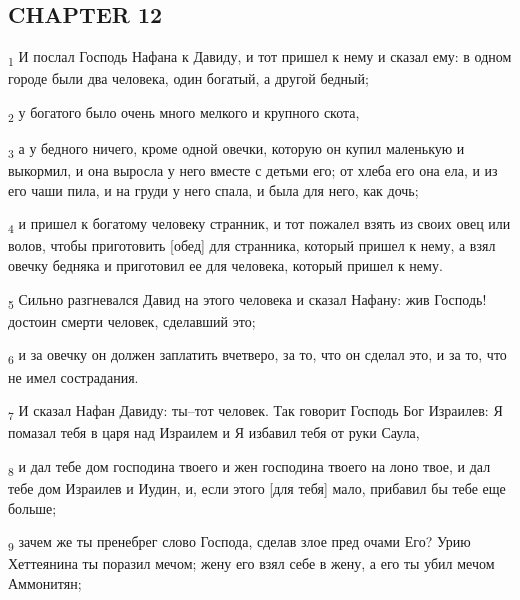 \subsection{CHAPTER 12}
\begin{tcolorbox}
\textsubscript{1} И послал Господь Нафана к Давиду, и тот пришел к нему и сказал ему: в одном городе были два человека, один богатый, а другой бедный;
\end{tcolorbox}
\begin{tcolorbox}
\textsubscript{2} у богатого было очень много мелкого и крупного скота,
\end{tcolorbox}
\begin{tcolorbox}
\textsubscript{3} а у бедного ничего, кроме одной овечки, которую он купил маленькую и выкормил, и она выросла у него вместе с детьми его; от хлеба его она ела, и из его чаши пила, и на груди у него спала, и была для него, как дочь;
\end{tcolorbox}
\begin{tcolorbox}
\textsubscript{4} и пришел к богатому человеку странник, и тот пожалел взять из своих овец или волов, чтобы приготовить [обед] для странника, который пришел к нему, а взял овечку бедняка и приготовил ее для человека, который пришел к нему.
\end{tcolorbox}
\begin{tcolorbox}
\textsubscript{5} Сильно разгневался Давид на этого человека и сказал Нафану: жив Господь! достоин смерти человек, сделавший это;
\end{tcolorbox}
\begin{tcolorbox}
\textsubscript{6} и за овечку он должен заплатить вчетверо, за то, что он сделал это, и за то, что не имел сострадания.
\end{tcolorbox}
\begin{tcolorbox}
\textsubscript{7} И сказал Нафан Давиду: ты--тот человек. Так говорит Господь Бог Израилев: Я помазал тебя в царя над Израилем и Я избавил тебя от руки Саула,
\end{tcolorbox}
\begin{tcolorbox}
\textsubscript{8} и дал тебе дом господина твоего и жен господина твоего на лоно твое, и дал тебе дом Израилев и Иудин, и, если этого [для тебя] мало, прибавил бы тебе еще больше;
\end{tcolorbox}
\begin{tcolorbox}
\textsubscript{9} зачем же ты пренебрег слово Господа, сделав злое пред очами Его? Урию Хеттеянина ты поразил мечом; жену его взял себе в жену, а его ты убил мечом Аммонитян;
\end{tcolorbox}
